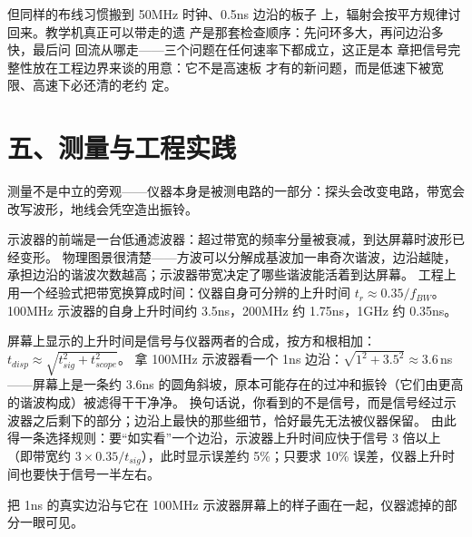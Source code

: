 但同样的布线习惯搬到 50MHz 时钟、0.5ns 边沿的板子
上，辐射会按平方规律讨回来。教学机真正可以带走的遗
产是那套检查顺序：先问环多大，再问边沿多快，最后问
回流从哪走——三个问题在任何速率下都成立，这正是本
章把信号完整性放在工程边界来谈的用意：它不是高速板
才有的新问题，而是低速下被宽限、高速下必还清的老约
定。

\section{五、测量与工程实践}

测量不是中立的旁观——仪器本身是被测电路的一部分：探头会改变电路，带宽会改写波形，地线会凭空造出振铃。

示波器的前端是一台低通滤波器：超过带宽的频率分量被衰减，到达屏幕时波形已经变形。
物理图景很清楚——方波可以分解成基波加一串奇次谐波，边沿越陡，承担边沿的谐波次数越高；示波器带宽决定了哪些谐波能活着到达屏幕。
工程上用一个经验式把带宽换算成时间：仪器自身可分辨的上升时间 $t_r \approx 0.35 / f_{BW}$。
100MHz 示波器的自身上升时间约 3.5ns，200MHz 约 1.75ns，1GHz 约 0.35ns。

屏幕上显示的上升时间是信号与仪器两者的合成，按方和根相加：$t_{disp} \approx \sqrt{t_{sig}^2 + t_{scope}^2}$。
拿 100MHz 示波器看一个 1ns 边沿：$\sqrt{1^2 + 3.5^2} \approx 3.6$\,ns——屏幕上是一条约 3.6ns 的圆角斜坡，原本可能存在的过冲和振铃（它们由更高的谐波构成）被滤得干干净净。
换句话说，你看到的不是信号，而是信号经过示波器之后剩下的部分；边沿上最快的那些细节，恰好最先无法被仪器保留。
由此得一条选择规则：要“如实看”一个边沿，示波器上升时间应快于信号 3 倍以上（即带宽约 $3 \times 0.35/t_{sig}$），此时显示误差约 5\%；只要求 10\% 误差，仪器上升时间也要快于信号一半左右。

把 1ns 的真实边沿与它在 100MHz 示波器屏幕上的样子画在一起，仪器滤掉的部分一眼可见。

